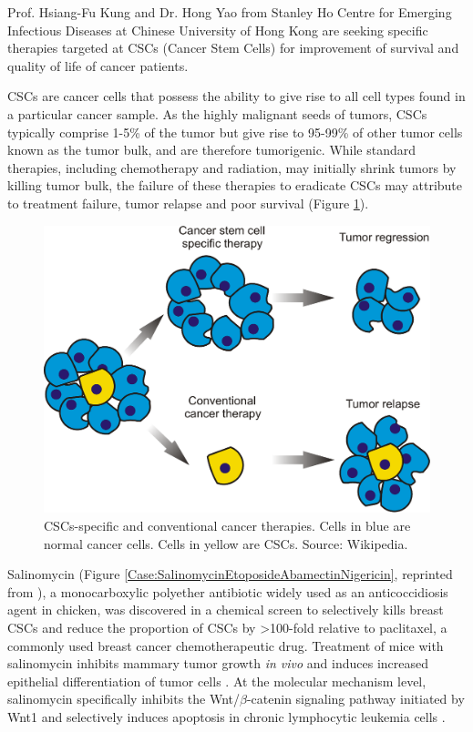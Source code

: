 Prof. Hsiang-Fu Kung and Dr. Hong Yao from Stanley Ho Centre for Emerging Infectious Diseases at Chinese University of Hong Kong are seeking specific therapies targeted at CSCs (Cancer Stem Cells) for improvement of survival and quality of life of cancer patients.

CSCs are cancer cells that possess the ability to give rise to all cell types found in a particular cancer sample. As the highly malignant seeds of tumors, CSCs typically comprise 1-5\% of the tumor but give rise to 95-99\% of other tumor cells known as the tumor bulk, and are therefore tumorigenic. While standard therapies, including chemotherapy and radiation, may initially shrink tumors by killing tumor bulk, the failure of these therapies to eradicate CSCs may attribute to treatment failure, tumor relapse and poor survival (Figure \ref{Case:CancerStemCell}).

\begin{figure}
\centering
\includegraphics[width=\linewidth]{Case/CancerStemCell.eps}
\caption{CSCs-specific and conventional cancer therapies. Cells in blue are normal cancer cells. Cells in yellow are CSCs. Source: Wikipedia.}
\label{Case:CancerStemCell}
\end{figure}

Salinomycin (Figure \ref{Case:SalinomycinEtoposideAbamectinNigericin}, reprinted from \citep{1147}), a monocarboxylic polyether antibiotic widely used as an anticoccidiosis agent in chicken, was discovered in a chemical screen to selectively kills breast CSCs and reduce the proportion of CSCs by >100-fold relative to paclitaxel, a commonly used breast cancer chemotherapeutic drug. Treatment of mice with salinomycin inhibits mammary tumor growth \textit{in vivo} and induces increased epithelial differentiation of tumor cells \citep{1147}. At the molecular mechanism level, salinomycin specifically inhibits the Wnt/$\beta$-catenin signaling pathway initiated by Wnt1 and selectively induces apoptosis in chronic lymphocytic leukemia cells \citep{1148}.

